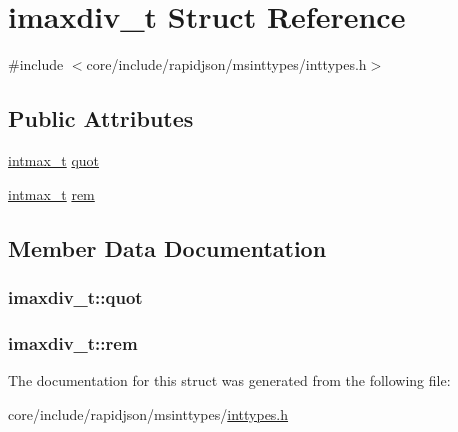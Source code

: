 \hypertarget{structimaxdiv__t}{}\section{imaxdiv\+\_\+t Struct Reference}
\label{structimaxdiv__t}


{\ttfamily \#include $<$core/include/rapidjson/msinttypes/inttypes.\+h$>$}

\subsection*{Public Attributes}
\begin{DoxyCompactItemize}
\item 
\hyperlink{stdint_8h_a036cd61bb4b30bb510b9538af4cebd1d}{intmax\+\_\+t} \hyperlink{structimaxdiv__t_a9339814cbb7610c72fb7d30c6573b393}{quot}
\item 
\hyperlink{stdint_8h_a036cd61bb4b30bb510b9538af4cebd1d}{intmax\+\_\+t} \hyperlink{structimaxdiv__t_a6c9701ad10bff81edae7ff679cae7850}{rem}
\end{DoxyCompactItemize}


\subsection{Member Data Documentation}
\subsubsection[{\texorpdfstring{quot}{quot}}]{ imaxdiv\+\_\+t\+::quot}\hypertarget{structimaxdiv__t_a9339814cbb7610c72fb7d30c6573b393}{}\label{structimaxdiv__t_a9339814cbb7610c72fb7d30c6573b393}
\subsubsection[{\texorpdfstring{rem}{rem}}]{ imaxdiv\+\_\+t\+::rem}\hypertarget{structimaxdiv__t_a6c9701ad10bff81edae7ff679cae7850}{}\label{structimaxdiv__t_a6c9701ad10bff81edae7ff679cae7850}


The documentation for this struct was generated from the following file\+:\begin{DoxyCompactItemize}
\item 
core/include/rapidjson/msinttypes/\hyperlink{inttypes_8h}{inttypes.\+h}\end{DoxyCompactItemize}
